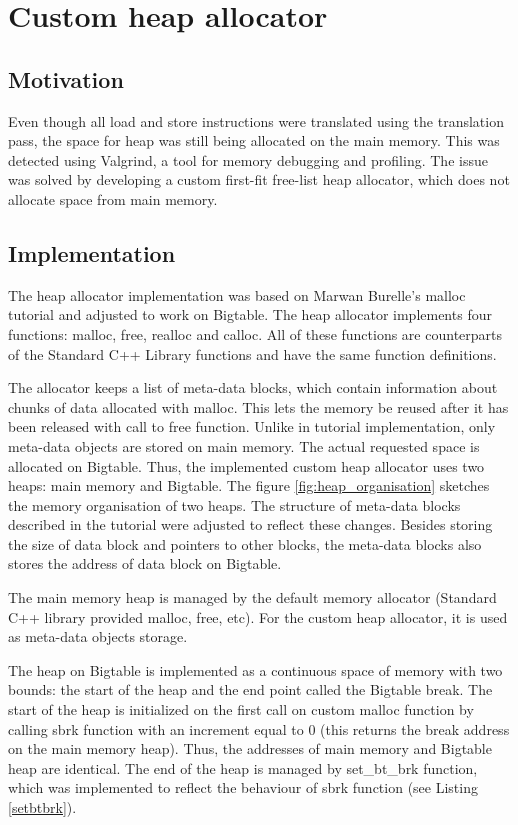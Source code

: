 \documentclass[bsc,frontabs,twoside,singlespacing,parskip,deptreport]{infthesis}     %
\begin{document}
\chapter{Custom heap allocator}

\section{Motivation}

Even though all load and store instructions were translated using the translation pass, the space for heap was still being allocated on the main memory. This was detected using Valgrind, a tool for memory debugging and profiling.
The issue was solved by developing a custom first-fit free-list heap allocator, which does not allocate space from main memory.

\section{Implementation}

The heap allocator implementation was based on Marwan Burelle's malloc tutorial \citep{malloc_tutorial} and adjusted to work on Bigtable. The heap allocator implements four functions: malloc, free, realloc and calloc. All of these functions are counterparts of the Standard C++ Library functions and have the same function definitions.

The allocator keeps a list of meta-data blocks, which contain information about chunks of data allocated with malloc. This lets the memory be reused after it has been released with call to free function. Unlike in tutorial implementation, only meta-data objects are stored on main memory. The actual requested space is allocated on Bigtable. Thus, the implemented custom heap allocator uses two heaps: main memory and Bigtable. The figure \ref{fig:heap_organisation} sketches the memory organisation of two heaps. The structure of meta-data blocks described in the tutorial were adjusted to reflect these changes. Besides storing the size of data block and pointers to other blocks, the meta-data blocks also stores the address of data block on Bigtable.

The main memory heap is managed by the default memory allocator (Standard C++ library provided malloc, free, etc). For the custom heap allocator, it is used as meta-data objects storage.

The heap on Bigtable is implemented as a continuous space of memory with two bounds: the start of the heap and the end point  called the Bigtable break. The start of the heap is initialized on the first call on custom malloc function by calling sbrk function with an increment equal to 0 (this returns the break address on the main memory heap). Thus, the addresses of main memory and Bigtable heap are identical. The end of the heap is managed by set\_bt\_brk function, which was implemented to reflect the behaviour of sbrk function (see Listing \ref{setbtbrk}).
\end{document}
